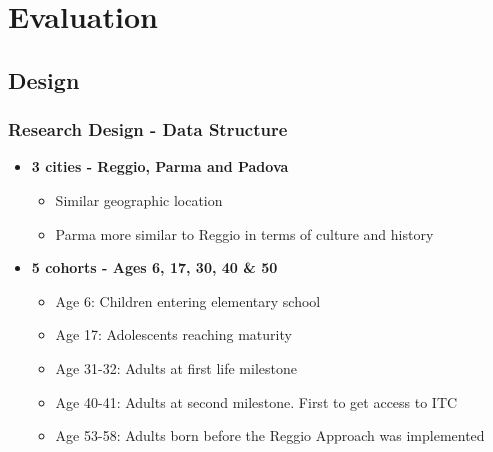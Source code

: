 \section{Evaluation}
\subsection{Design}
\begin{frame}
\frametitle{Research Design - Data Structure} 
\begin{itemize}
	\item \textbf{3 cities - Reggio, Parma and Padova}
	\begin{itemize}
		\item Similar geographic location
		\item Parma more similar to Reggio in terms of culture and history
	\end{itemize}
	\bigskip
	\item \textbf{5 cohorts - Ages 6, 17, 30, 40 \&  50}
	\begin{itemize}
		\item Age 6: Children entering elementary school
		\item Age 17: Adolescents reaching maturity
		\item Age 31-32: Adults at first life milestone
		\item Age 40-41: Adults at second milestone. First to get access to ITC
		\item Age 53-58: Adults born before the Reggio Approach was implemented
	\end{itemize}
\end{itemize}
\end{frame} 

